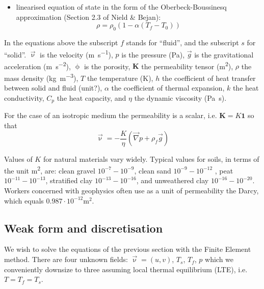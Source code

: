 \begin{itemize}
\item linearised equation of state in the form of the Oberbeck-Boussinesq approximation (Section 2.3 of Nield \& Bejan):
\[
\rho=\rho_0(1-\alpha(T_f-T_0))
\]
\end{itemize}

\noindent In the equations above the subscript $f$ stands for ``fluid'', and the subscript $s$ for ``solid''. $\vec{\upnu}$ is the velocity (\si{\metre\per\second}), $p$ is the pressure (\si{\pascal}), $\vec{g}$ is the gravitational acceleration (\si{\metre\per\square\second}), $\upphi$ is the porosity, ${\bm K}$ the permeability tensor (\si{\square\metre}), $\rho$ the mass density (\si{\kg\per\cubic\metre}), $T$ the temperature (\si{\kelvin}), $h$ the coefficient of heat transfer between solid and fluid (unit?), $\alpha$ the coefficient of thermal expansion, $k$ the heat conductivity, $C_p$ the heat capacity, and $\eta$ the dynamic viscosity (\si{\pascal\second}). 

For the case of an isotropic medium the permeability is a scalar, i.e. ${\bm K}=K {\bm 1}$ so that 
\begin{equation}
\vec{\upnu} = -\frac{K}{\eta} (\vec\nabla p + \rho_f \vec{g})
\label{eq:darcy2}
\end{equation}

Values of $K$ for natural materials vary widely. Typical values for soils, in terms of the unit \si{\square\metre}, 
are: clean gravel $10^{-7}-10^{-9}$, 
clean sand $10^{-9}-10^{-12}$ , peat $10^{-11}-10^{-13}$,
stratified clay $10^{-13}-10^{-16}$, 
and unweathered clay $10^{-16}-10^{-20}$. 
Workers concerned with geophysics often use as a unit of permeability the Darcy, which equals $0.987\cdot 10^{-12}\si{\square\metre}$.



\subsection{Weak form and discretisation}

We wish to solve the equations of the previous section 
with the Finite Element method. 
There are four unknown fields: $\vec{\upnu}=(u,v)$, $T_s$, $T_f$, $p$
which we conveniently downsize to three assuming local thermal equilibrium (LTE), i.e. $T=T_f=T_s$.

